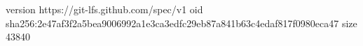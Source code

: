 version https://git-lfs.github.com/spec/v1
oid sha256:2e47af3f2a5bea9006992a1e3ca3edfc29eb87a841b63c4edaf817f0980eca47
size 43840
